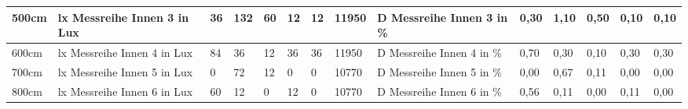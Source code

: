 \begin{table}[H]
{\begin{tabular}{|l|l|l|l|l|l|l|l|l|l|l|l|l|l|}
  \rowcolor[HTML]{C6E0B4} 
  500cm                                             & lx   Messreihe Innen 3 in Lux                                   & 36                                & 132                               & 60                                & 12                                & 12                                & \cellcolor[HTML]{A9D08E}11950         & D   Messreihe Innen 3 in \%                                     & 0,30                                      & 1,10                                       & 0,50                                       & 0,10                                       & 0,10                                       \\ \hline
  \rowcolor[HTML]{E2EFDA} 
  600cm                                             & lx   Messreihe Innen 4 in Lux                                   & 84                                & 36                                & 12                                & 36                                & 36                                & \cellcolor[HTML]{A9D08E}11950         & D   Messreihe Innen 4 in \%                                     & 0,70                                      & 0,30                                       & 0,10                                       & 0,30                                       & 0,30                                       \\ \hline
  \rowcolor[HTML]{C6E0B4} 
  700cm                                             & lx   Messreihe Innen 5 in Lux                                    & 0                                 & 72                                & 12                                & 0                                 & 0                                 & \cellcolor[HTML]{A9D08E}10770         & D  Messreihe Innen 5 in \%                                      & 0,00                                      & 0,67                                       & 0,11                                       & 0,00                                       & 0,00                                       \\ \hline
  \rowcolor[HTML]{E2EFDA} 
  800cm                                             & lx   Messreihe Innen 6 in Lux                                   & 60                                & 12                                & 0                                 & 12                                & 0                                 & \cellcolor[HTML]{A9D08E}10770         & D   Messreihe Innen 6 in \%                                     & 0,56                                      & 0,11                                       & 0,00                                       & 0,11                                       & 0,00                                       \\ \hline
  \end{tabular}%
  }
  \end{table}

